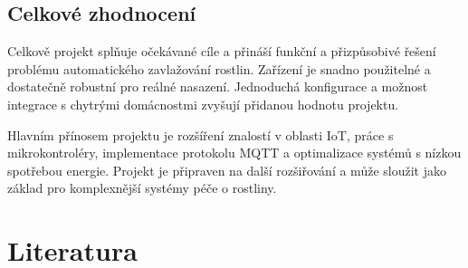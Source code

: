 \documentclass[a4paper, 11pt]{article}
\begin{document}
\subsection{Celkové zhodnocení}

Celkově projekt splňuje očekávané cíle a přináší funkční a přizpůsobivé řešení problému automatického zavlažování rostlin. Zařízení je snadno použitelné 
a dostatečně robustní pro reálné nasazení. Jednoduchá konfigurace a možnost integrace s chytrými domácnostmi zvyšují přidanou hodnotu projektu.

Hlavním přínosem projektu je rozšíření znalostí v oblasti IoT, práce s mikrokontroléry, implementace protokolu MQTT a optimalizace systémů s nízkou spotřebou energie. 
Projekt je připraven na další rozšiřování a může sloužit jako základ pro komplexnější systémy péče o rostliny.

\section{Literatura}


\end{document}
